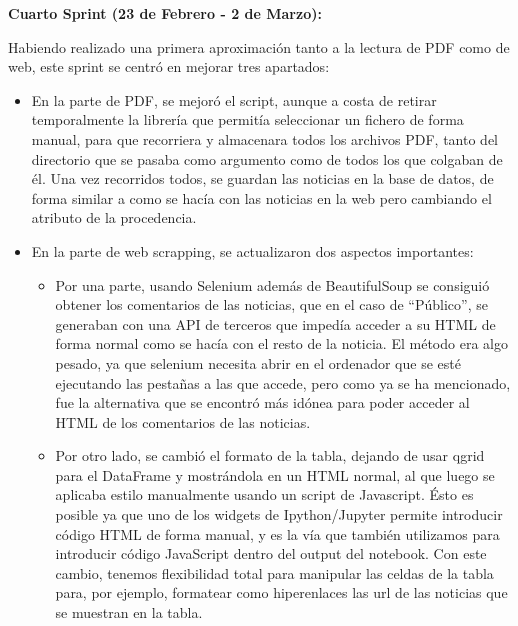 

\textbf{Cuarto Sprint (23 de Febrero - 2 de Marzo):}

Habiendo realizado una primera aproximación tanto a la lectura de PDF como de web, este sprint se centró en mejorar tres apartados:

\begin{itemize}

\item En la parte de PDF, se mejoró el script, aunque a costa de retirar temporalmente la librería que permitía seleccionar un fichero de forma manual, para que recorriera y almacenara todos los archivos PDF, tanto del directorio que se pasaba como argumento como de todos los que colgaban de él. Una vez recorridos todos, se guardan las noticias en la base de datos, de forma similar a como se hacía con las noticias en la web pero cambiando el atributo de la procedencia.

\item En la parte de web scrapping, se actualizaron dos aspectos importantes:

\begin{itemize}

\item Por una parte, usando Selenium además de BeautifulSoup se consiguió obtener los comentarios de las noticias, que en el caso de “Público”, se generaban con una API de terceros que impedía acceder a su HTML de forma normal como se hacía con el resto de la noticia. El método era algo pesado, ya que selenium necesita abrir en el ordenador que se esté ejecutando las pestañas a las que accede, pero como ya se ha mencionado, fue la alternativa que se encontró más idónea para poder acceder al HTML de los comentarios de las noticias.

\item Por otro lado, se cambió el formato de la tabla, dejando de usar qgrid para el DataFrame y mostrándola en un HTML normal, al que luego se aplicaba estilo manualmente usando un script de Javascript. Ésto es posible ya que uno de los widgets de Ipython/Jupyter permite introducir código HTML de forma manual, y es la vía que también utilizamos para introducir código JavaScript dentro del output del notebook. Con este cambio, tenemos flexibilidad total para manipular las celdas de la tabla para, por ejemplo, formatear como hiperenlaces las url de las noticias que se muestran en la tabla.


\end{itemize}

\end{itemize}


